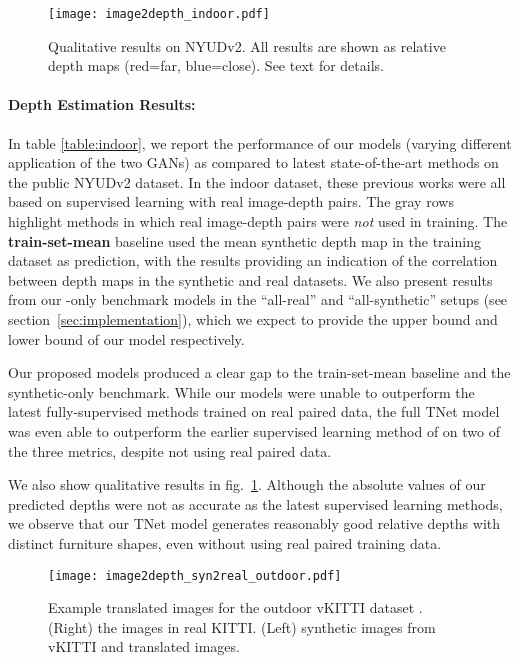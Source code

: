 \documentclass[runningheads]{llncs}
\begin{document}
\begin{figure}[tb!]
	\centering
	\texttt{[image: image2depth\_indoor.pdf]}
	\caption{Qualitative results on NYUDv2. All results are shown as relative depth maps (red=far, blue=close). See text for details. }
	\label{fig:depth_indoor}
\end{figure}

\paragraph{\bf Depth Estimation Results:} In table \ref{table:indoor}, we report the performance of our models (varying different application of the two GANs) as compared to latest state-of-the-art methods on the public NYUDv2 dataset. In the indoor dataset, these previous works were all based on supervised learning with real image-depth pairs. The gray rows highlight methods in which real image-depth pairs were \emph{not} used in training. The {\bf train-set-mean} baseline used the mean synthetic depth map in the training dataset as prediction, with the results providing an indication of the correlation between depth maps in the synthetic and real datasets.
We also present results from our -only benchmark models in the ``all-real'' and ``all-synthetic'' setups (see section~\ref{sec:implementation}), which we expect to provide the upper bound and lower bound of our model respectively.

Our proposed models produced a clear gap to the train-set-mean baseline and the synthetic-only benchmark. While our models were unable to outperform the latest fully-supervised methods trained on real paired data, the full TNet model was even able to outperform the earlier supervised learning method of \cite{ladicky2014pulling} on two of the three metrics, despite not using real paired data.

We also show qualitative results in fig.~\ref{fig:depth_indoor}. Although the absolute values of our predicted depths were not as accurate as the latest supervised learning methods, we observe that our TNet model generates reasonably good relative depths with distinct furniture shapes, even without using real paired training data. 


\begin{figure}[tb!]
	\centering
	\texttt{[image: image2depth\_syn2real\_outdoor.pdf]}
	\caption{Example translated images for the outdoor vKITTI dataset \cite{gaidon2016virtualworlds}. (Right) the images in real KITTI. (Left) synthetic images from vKITTI and translated images.}
	\label{fig:syn2real_kitti}
\end{figure}
\end{document}
